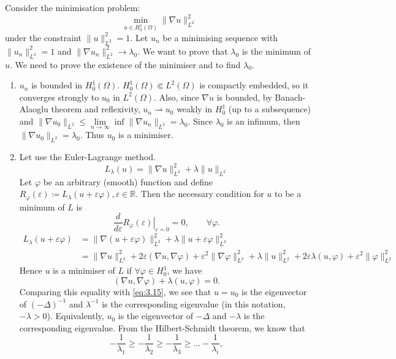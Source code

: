 \documentclass{report}
\begin{document}
Consider the minimisation problem:
\[
    \min\limits_{u \in H^{1}_{0}(\Omega)}\|\nabla u\|_{L^{2}}^{2}
\]
under the constraint \(\|u\|_{L^{2}}^{2} = 1\). Let \(u_{n}\) be a minimising sequence with \(\|u_{n}\|_{L^{2}}^{2} = 1\) and \(\|\nabla u_{n}\|_{L^{2}}^{2} \to \lambda_{0}\). We want to prove that \(\lambda_{0}\) is the minimum of \(u\). We need to prove the existence of the minimiser and to find \(\lambda_{0}\).

\begin{enumerate}
    \item \(u_{n}\) is bounded in \(H^{1}_{0}(\Omega)\). \(H^{1}_{0}(\Omega) \Subset L^{2}(\Omega)\) is compactly embedded, so it converges strongly to \(u_{0}\) in \(L^{2}(\Omega)\). Also, since \(\nabla u\) is bounded, by Banach-Alaoglu theorem and reflexivity, \(u_{n} \rightharpoonup u_{0}\) weakly in \(H^{1}_{0}\) (up to a subsequence) and \(\|\nabla u_{0}\|_{L^{2}} \leq \lim\limits_{n \to \infty} \inf \|\nabla u_{n}\|_{L^{2}} = \lambda_{0}\). Since \(\lambda_{0}\) is an infimum, then \(\|\nabla u_{0}\|_{L^{2}} = \lambda_{0}\). Thus \(u_{0}\) is a minimiser.
    \item Let use the Euler-Lagrange method.
    \[
        L_{\lambda}(u) = \|\nabla u\|_{L^{2}}^{2} + \lambda\|u\|_{L^{2}}
    \]
    Let \(\varphi\) be an arbitrary (smooth) function and define \(R_{\varphi}(\varepsilon) \coloneqq L_{\lambda}(u + \varepsilon\varphi), \varepsilon \in \mathbb{R}\). Then the necessary condition for \(u\) to be a minimum of \(L\) is
    \[
        \frac{d}{d\varepsilon} \left. R_{\varphi}(\varepsilon) \right|_{\varepsilon = 0} = 0, \qquad \forall \varphi.
    \]
    \begin{align*}
        L_{\lambda}(u + \varepsilon\varphi) &= \|\nabla (u + \varepsilon\varphi)\|_{L^{2}}^{2} + \lambda\|u + \varepsilon\varphi\|_{L^{2}}^{2} \\
        &= \|\nabla u\|_{L^{2}}^{2} + 2\varepsilon(\nabla u, \nabla \varphi) + \varepsilon^{2}\|\nabla \varphi\|_{L^{2}}^2 + \lambda\|u\|_{L^{2}}^{2} + 2\varepsilon \lambda(u, \varphi) + \varepsilon^{2}\|\varphi\|_{L^{2}}^{2}
    \end{align*}
    Hence \(u\) is a minimiser of \(L\) if \(\forall \varphi \in H^{1}_{0}\), we have 
    \[
       (\nabla u, \nabla \varphi) + \lambda(u, \varphi) = 0.
    \]
    Comparing this equality with \ref{eq:3.15}, we see that \(u = u_{0}\) is the eigenvector of \((-\Delta)^{-1}\) and \(\lambda^{-1}\) is the corresponding eigenvalue (in this notation, \(-\lambda > 0\)). Equivalently, \(u_{0}\) is the eigenvector of \(-\Delta\) and \(-\lambda\) is the corresponding eigenvalue. From the Hilbert-Schmidt theorem, we know that
    \begin{equation}\label{eq:3.16}
        -\frac{1}{\lambda_{1}} \geq -\frac{1}{\lambda_{2}} \geq -\frac{1}{\lambda_{3}} \geq \dots -\frac{1}{\lambda_{i}},
    \end{equation}


\end{enumerate}
\end{document}
